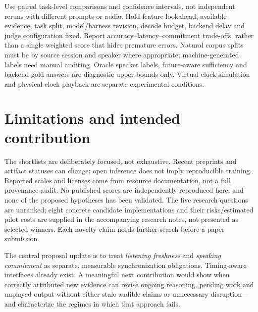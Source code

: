 \documentclass{article}
\begin{document}
Use paired task-level comparisons and confidence intervals, not independent reruns with different prompts or audio. Hold feature lookahead, available evidence, task split, model/harness revision, decode budget, backend delay and judge configuration fixed. Report accuracy--latency--commitment trade-offs, rather than a single weighted score that hides premature errors. Natural corpus splits must be by source session and speaker where appropriate; machine-generated labels need manual auditing. Oracle speaker labels, future-aware sufficiency and backend gold answers are diagnostic upper bounds only. Virtual-clock simulation and physical-clock playback are separate experimental conditions.

\section{Limitations and intended contribution}
\label{sec:limits}
The shortlists are deliberately focused, not exhaustive. Recent preprints and artifact statuses can change; open inference does not imply reproducible training. Reported scales and licenses come from resource documentation, not a full provenance audit. No published scores are independently reproduced here, and none of the proposed hypotheses has been validated. The five research questions are unranked; eight concrete candidate implementations and their risks/estimated pilot costs are supplied in the accompanying research notes, not presented as selected winners. Each novelty claim needs further search before a paper submission.

The central proposal update is to treat \emph{listening freshness} and \emph{speaking commitment} as separate, measurable synchronization obligations. Timing-aware interfaces already exist. A meaningful next contribution would show when correctly attributed new evidence can revise ongoing reasoning, pending work and unplayed output without either stale audible claims or unnecessary disruption---and characterize the regimes in which that approach fails.

\begingroup
\small


\endgroup
\end{document}
